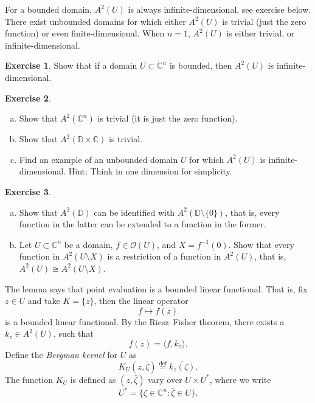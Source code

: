 \documentclass[12pt,openany]{book}
\newcommand{\linnprod}[2]{\langle #1 , #2 \rangle}
\newcommand{\C}{{\mathbb{C}}}
\newcommand{\D}{{\mathbb{D}}}
\newcommand{\sO}{{\mathscr{O}}}
\newcommand{\myindex}[1]{#1\index{#1}}
\theoremstyle{plain}
\theoremstyle{remark}
\theoremstyle{definition}
\newenvironment{exbox}{%
    \def\FrameCommand{\vrule width 1pt \relax\hspace{10pt}}%
    \MakeFramed{\advance\hsize-\width\FrameRestore}%
}{%
    \endMakeFramed
}
\newenvironment{exparts}{%
    \leavevmode\begin{enumerate}[a),noitemsep,topsep=0pt,parsep=0pt,partopsep=0pt]
}{%
    \end{enumerate}
}
\theoremstyle{exercise}
\newtheorem{exercise}{Exercise}[section]
\theoremstyle{example}
\begin{document}
For a bounded domain, $A^2(U)$ is always infinite-dimensional, see exercise
below.  There exist unbounded domains for which either
$A^2(U)$ is trivial (just the zero function) or even finite-dimensional.
When $n=1$, $A^2(U)$ is either trivial, or infinite-dimensional.

\begin{exbox}
\begin{exercise}
Show that if a domain $U \subset \C^n$ is bounded, then $A^2(U)$ is
infinite-dimensional.
\end{exercise}

\begin{exercise}
\begin{exparts}
\item
Show that $A^2(\C^n)$ is trivial (it is just the zero function).
\item
Show that $A^2(\D \times \C)$ is trivial.
\item
Find an example of an unbounded domain $U$ for which $A^2(U)$ is
infinite-dimensional.
Hint: Think in one dimension for simplicity.
\end{exparts}
\end{exercise}

\begin{exercise} \label{exercise:bergmanpunctureddisc}
\begin{exparts}
\item
Show that $A^2(\D)$ can be identified with $A^2(\D \setminus \{ 0 \})$,
that is, every function in the latter can be extended to a function in the
former.
\item
Let $U \subset \C^n$ be a domain, $f \in \sO(U)$, and $X = f^{-1}(0)$.
Show that every function in $A^2(U \setminus X)$ is a restriction of a
function in $A^2(U)$, that is, $A^2(U) \cong A^2(U \setminus X)$.
\end{exparts}
\end{exercise}
\end{exbox}

The lemma says that
point evaluation is a bounded linear
functional.
That is, fix $z \in U$ and take $K= \{ z \}$, then the linear operator
\begin{equation*}
f \mapsto f(z)
\end{equation*}
is a bounded linear functional.  By the Riesz--Fisher theorem, there exists
a $k_z \in A^2(U)$, such that
\begin{equation*}
f(z) = \linnprod{f}{k_z} .
\end{equation*}
Define the \emph{\myindex{Bergman kernel}} for $U$ as
%
\begin{equation*}
K_U(z,\bar{\zeta}) \overset{\text{def}}{=} \overline{k_z(\zeta)} .
\end{equation*}
The function $K_U$ is defined as $(z,\bar{\zeta})$ vary over
%
$U \times U^*$, where we write
\begin{equation*}
U^* = \{ \zeta \in \C^n : \bar{\zeta} \in U \}.
\end{equation*}
\end{document}
